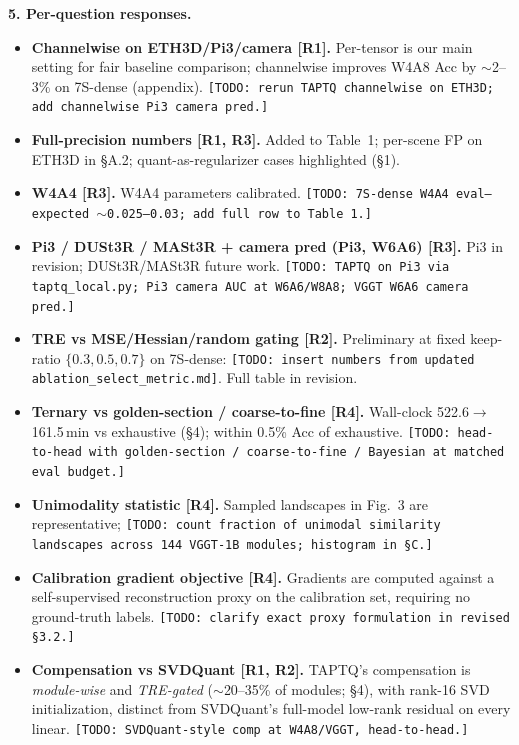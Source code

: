\documentclass[9pt]{article}
\begin{document}
\smallskip
\noindent\textbf{5. Per-question responses.}
\begin{itemize}
\item \textbf{Channelwise on ETH3D/Pi3/camera [R1].} Per-tensor is our main setting for fair baseline comparison; channelwise improves W4A8 Acc by $\sim$2--3\% on 7S-dense (appendix). \texttt{[TODO: rerun TAPTQ channelwise on ETH3D; add channelwise Pi3 camera pred.]}

\item \textbf{Full-precision numbers [R1, R3].} Added to Table~1; per-scene FP on ETH3D in \S A.2; quant-as-regularizer cases highlighted (\S 1).

\item \textbf{W4A4 [R3].} W4A4 parameters calibrated. \texttt{[TODO: 7S-dense W4A4 eval---expected $\sim$0.025--0.03; add full row to Table~1.]}

\item \textbf{Pi3 / DUSt3R / MASt3R + camera pred (Pi3, W6A6) [R3].} Pi3 in revision; DUSt3R/MASt3R future work. \texttt{[TODO: TAPTQ on Pi3 via taptq\_local.py; Pi3 camera AUC at W6A6/W8A8; VGGT W6A6 camera pred.]}

\item \textbf{TRE vs MSE/Hessian/random gating [R2].} Preliminary at fixed keep-ratio $\{0.3, 0.5, 0.7\}$ on 7S-dense: \texttt{[TODO: insert numbers from updated ablation\_select\_metric.md]}. Full table in revision.

\item \textbf{Ternary vs golden-section / coarse-to-fine [R4].} Wall-clock 522.6$\to$161.5\,min vs exhaustive (\S 4); within 0.5\% Acc of exhaustive. \texttt{[TODO: head-to-head with golden-section / coarse-to-fine / Bayesian at matched eval budget.]}

\item \textbf{Unimodality statistic [R4].} Sampled landscapes in Fig.~3 are representative; \texttt{[TODO: count fraction of unimodal similarity landscapes across 144 VGGT-1B modules; histogram in \S C.]}

\item \textbf{Calibration gradient objective [R4].} Gradients are computed against a self-supervised reconstruction proxy on the calibration set, requiring no ground-truth labels. \texttt{[TODO: clarify exact proxy formulation in revised \S 3.2.]}

\item \textbf{Compensation vs SVDQuant [R1, R2].} TAPTQ's compensation is \emph{module-wise} and \emph{TRE-gated} ($\sim$20--35\% of modules; \S 4), with rank-16 SVD initialization, distinct from SVDQuant's full-model low-rank residual on every linear. \texttt{[TODO: SVDQuant-style comp at W4A8/VGGT, head-to-head.]}


\end{itemize}
\end{document}
